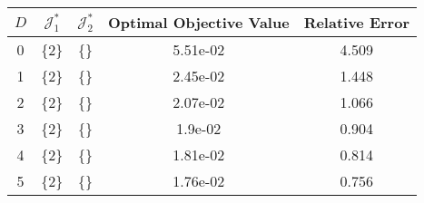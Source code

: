\begin{subtable}{\textwidth}
\centering
\begin{tabular}{|c|c|c|c|c|}
  \hline
$D$ & $\mathcal J_1^*$ & $\mathcal J_2^*$ & Optimal Objective Value & Relative Error \\ 
  \hline
0 & \{2\} & \{\} & 5.51e-02 & 4.509 \\ 
  1 & \{2\} & \{\} & 2.45e-02 & 1.448 \\ 
  2 & \{2\} & \{\} & 2.07e-02 & 1.066 \\ 
  3 & \{2\} & \{\} & 1.9e-02 & 0.904 \\ 
  4 & \{2\} & \{\} & 1.81e-02 & 0.814 \\ 
  5 & \{2\} & \{\} & 1.76e-02 & 0.756 \\ 
   \hline
\end{tabular}
\end{subtable}
